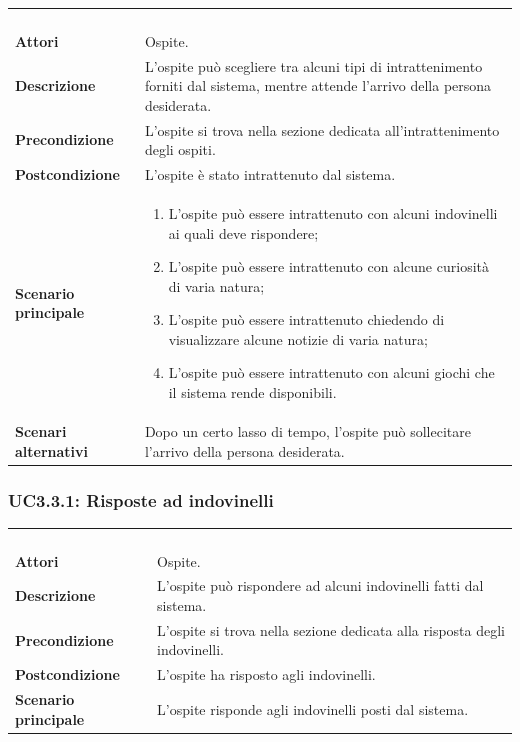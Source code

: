 \begin{longtable}{l|p{10cm}}
\rowcolor[gray]{0.8} \multicolumn{2}{c}{} \\
\rowcolor[gray]{0.8} \multicolumn{2}{c}{\textbf{UC3.3 - Intrattenimento ospite}} \\
\rowcolor[gray]{0.8} \multicolumn{2}{c}{} \\
\hline
&\\
\textbf{Attori} & Ospite.\\[7pt]
\textbf{Descrizione} & L'ospite può scegliere tra alcuni tipi di intrattenimento forniti dal sistema, mentre attende l'arrivo della persona desiderata.\\[7pt]
\textbf{Precondizione} & L'ospite si trova nella sezione dedicata all'intrattenimento degli ospiti.\\[7pt]
\textbf{Postcondizione} & L'ospite è stato intrattenuto dal sistema.\\[7pt]
\textbf{Scenario principale} &\begin{enumerate}
\item  L'ospite può essere intrattenuto con alcuni indovinelli ai quali deve rispondere;
\item  L'ospite può essere intrattenuto con alcune curiosità di varia natura;
\item  L'ospite può essere intrattenuto chiedendo di visualizzare alcune notizie di varia natura;
\item  L'ospite può essere intrattenuto con alcuni giochi che il sistema rende disponibili.
\end{enumerate}
\\[7pt]
\textbf{Scenari alternativi} & Dopo un certo lasso di tempo, l'ospite può sollecitare l'arrivo della persona desiderata.\\[7pt]\hline
\end{longtable}

\subsubsection{UC3.3.1: Risposte ad indovinelli}
\label{UC3.3.1}
\begin{longtable}{l|p{10cm}}
\rowcolor[gray]{0.8} \multicolumn{2}{c}{} \\
\rowcolor[gray]{0.8} \multicolumn{2}{c}{\textbf{UC3.3.1 - Risposte ad indovinelli}} \\
\rowcolor[gray]{0.8} \multicolumn{2}{c}{} \\
\hline
&\\
\textbf{Attori} & Ospite.\\[7pt]
\textbf{Descrizione} & L'ospite può rispondere ad alcuni indovinelli fatti dal sistema.\\[7pt]
\textbf{Precondizione} & L'ospite si trova nella sezione dedicata alla risposta degli indovinelli.\\[7pt]
\textbf{Postcondizione} & L'ospite ha risposto agli indovinelli.\\[7pt]
\textbf{Scenario principale} &L'ospite risponde agli indovinelli posti dal sistema.\\[7pt]\hline
\end{longtable}

